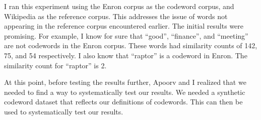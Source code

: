 I ran this experiment using the Enron corpus as the codeword corpus, and Wikipedia as the reference corpus. This addresses the issue of words not appearing in the reference corpus encountered earlier. The initial results were promising. For example, I know for sure that ``good'', ``finance'', and ``meeting'' are not codewords in the Enron corpus. These words had similarity counts of 142, 75, and 54 respectively. I also know that ``raptor'' is a codeword in Enron. The similarity count for ``raptor'' is 2.

At this point, before testing the results further, Apoorv and I realized that we needed to find a way to systematically test our results. We needed a synthetic codeword dataset that reflects our definitions of codewords. This can then be used to systematically test our results.